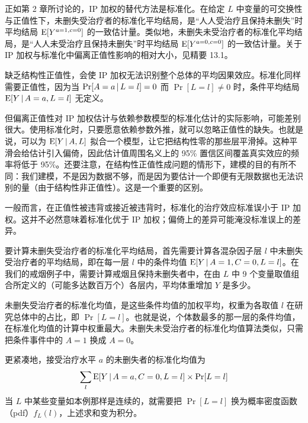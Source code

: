 正如第 2 章所讨论的，IP 加权的替代方法是标准化。在给定 $L$ 中变量的可交换性与正值性下，未删失受治疗者的标准化平均结局，是“人人受治疗且保持未删失”时平均结局 $\mathrm{E}[Y^{a=1,c=0}]$ 的一致估计量。类似地，未删失未受治疗者的标准化平均结局，是“人人未受治疗且保持未删失”时平均结局 $\mathrm{E}[Y^{a=0,c=0}]$ 的一致估计量。关于 IP 加权与标准化中偏离正值性影响的相对大小，见精要 13.1。

\renewcommand{\FPname}{精要（Fine Point）}
\begin{finepoint}[结构性正值性]
缺乏结构性正值性，会使 IP 加权无法识别整个总体的平均因果效应。标准化同样需要正值性，因为当 $\Pr[A=a\,|\, L=l]=0$ 而 $\Pr[L=l]\neq 0$ 时，条件平均结局 $\mathrm{E}[Y\,|\, A=a,L=l]$ 无定义。

但偏离正值性对 IP 加权估计与依赖参数模型的标准化估计的实际影响，可能差别很大。使用标准化时，只要愿意依赖参数外推，就可以忽略正值性的缺失。也就是说，可以为 $\mathrm{E}[Y\,|\, A,L]$ 拟合一个模型，让它把结构性零的那些层平滑掉。这种平滑会给估计引入偏倚，因此估计值周围名义上的 95\% 置信区间覆盖真实效应的频率将低于 95\%。还要注意，在结构性正值性成问题的情形下，建模的目的有所不同：我们建模，不是因为数据不够，而是因为要估计一个即便有无限数据也无法识别的量（由于结构性非正值性）。这是一个重要的区别。

一般而言，在正值性被违背或接近被违背时，标准化的治疗效应标准误小于 IP 加权。这并不必然意味着标准化优于 IP 加权；偏倚上的差异可能淹没标准误上的差异。
\end{finepoint}
\renewcommand{\FPname}{精要}

要计算未删失受治疗者的标准化平均结局，首先需要计算各混杂因子层 $l$ 中未删失受治疗者的平均结局，即在每一层 $l$ 中的条件均值 $\mathrm{E}[Y\,|\, A=1,C=0,L=l]$。在我们的戒烟例子中，需要计算戒烟且保持未删失者中，在由 $L$ 中 9 个变量取值组合所定义的（可能多达数百万个）各层内，平均体重增加 $Y$ 是多少。

未删失受治疗者的标准化均值，是这些条件均值的加权平均，权重为各取值 $l$ 在研究总体中的占比，即 $\Pr[L=l]$。也就是说，个体数最多的那一层的条件均值，在标准化均值的计算中权重最大。未删失未受治疗者的标准化均值算法类似，只需把条件事件中的 $A=1$ 换成 $A=0$。

更紧凑地，接受治疗水平 $a$ 的未删失者的标准化均值为
\[
\sum_l \mathrm{E}[Y\,|\, A=a,C=0,L=l]\times\Pr[L=l]
\]
当 $L$ 中某些变量如本例那样是连续的，就需要把 $\Pr[L=l]$ 换为概率密度函数（pdf）$f_L(l)$，上述求和变为积分。

